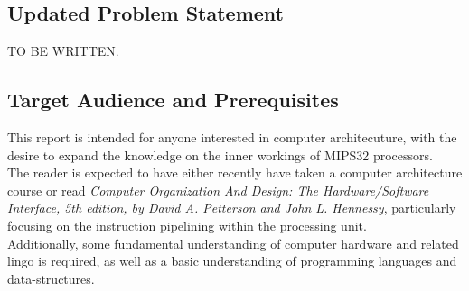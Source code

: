 \subsection*{Updated Problem Statement}
TO BE WRITTEN.

\subsection*{Target Audience and Prerequisites}
This report is intended for anyone interested in computer architecuture, with
the desire to expand the knowledge on the inner workings of MIPS32 processors.\\
The reader is expected to have either recently have taken a computer architecture course
or read \textit{Computer Organization And Design: The Hardware/Software Interface, 5th
edition, by David A. Petterson and John L. Hennessy}, particularly focusing on
the instruction pipelining within the processing unit.\\
Additionally, some fundamental understanding of computer hardware and related lingo is required,
as well as a basic understanding of programming languages and data-structures.


